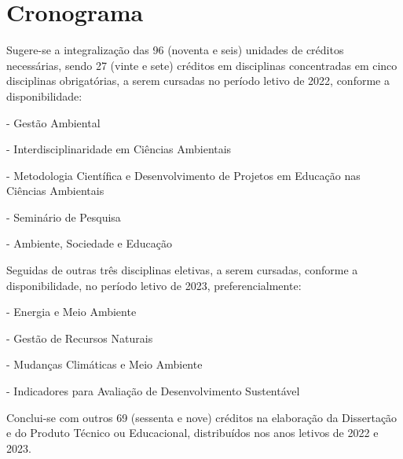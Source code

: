 \documentclass[
   article,       %
   12pt,          %
   oneside,       %
   a4paper,       %
   english,       %
   brazil,           %
   sumario=tradicional
   ]{abntex2}
\begin{document}
\section{Cronograma}

Sugere-se a integralização das 96 (noventa e seis) unidades de créditos necessárias, sendo 27 (vinte e sete) créditos em disciplinas concentradas em cinco disciplinas obrigatórias, a serem cursadas no período letivo de 2022, conforme a disponibilidade: 



\begin{description}[font=$\bullet$~\normalfont\scshape]



\item [DCI4002] - Gestão Ambiental
\item [DCI4003] - Interdisciplinaridade em Ciências Ambientais
\item [DCI4004] - Metodologia Científica e Desenvolvimento de Projetos em Educação nas Ciências Ambientais
\item [DCI4005] - Seminário de Pesquisa
\item [DCI4006] - Ambiente, Sociedade e Educação
\end{description}


Seguidas de outras três disciplinas eletivas, a serem cursadas, conforme a disponibilidade, no período letivo de 2023, preferencialmente:

\begin{description}[font=$\bullet$~\normalfont\scshape]


\item [DCI4011] - Energia e Meio Ambiente
\item [DCI4013] - Gestão de Recursos Naturais
\item [DCI4017] - Mudanças Climáticas e Meio Ambiente
\item [DCI4015] - Indicadores para Avaliação de Desenvolvimento Sustentável
\end{description}

Conclui-se com outros 69 (sessenta e nove) créditos na elaboração da Dissertação e do Produto Técnico ou Educacional, distribuídos nos anos letivos de 2022 e 2023.




\postextual


\end{document}
